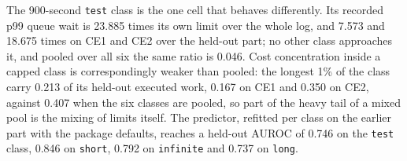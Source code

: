 \documentclass[mathematics,supfile,submit,moreauthors]{Definitions/mdpi}
\newcommand{\devnum}[1]{#1}
\begin{document}
The \devnum{900}-second \texttt{test} class is the one cell that behaves differently. Its
recorded p99 queue wait is \devnum{23.885} times its own limit over the whole log, and
\devnum{7.573} and \devnum{18.675} times on CE1 and CE2 over the held-out part; no other
class approaches it, and pooled over all six the same ratio is \devnum{0.046}. Cost
concentration inside a capped class is correspondingly weaker than pooled: the longest
\devnum{1\%} of the class carry \devnum{0.213} of its held-out executed work,
\devnum{0.167} on CE1 and \devnum{0.350} on CE2, against \devnum{0.407} when the six
classes are pooled, so part of the heavy tail of a mixed pool is the mixing of limits
itself. The predictor, refitted per class on the earlier part with the package defaults,
reaches a held-out AUROC of \devnum{0.746} on the \texttt{test} class, \devnum{0.846} on
\texttt{short}, \devnum{0.792} on \texttt{infinite} and \devnum{0.737} on \texttt{long}.
\end{document}
